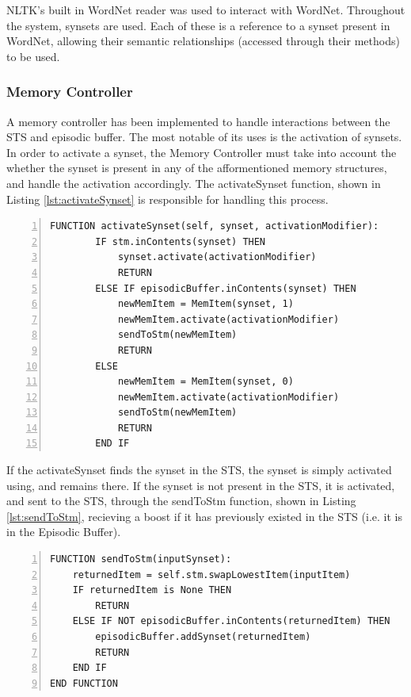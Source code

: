 \documentclass[]{article}
\begin{document}
NLTK's built in WordNet reader \cite{NLTK} was used to interact with WordNet. Throughout the system, synsets are used. Each of these is a reference to a synset present in WordNet, allowing their semantic relationships (accessed through their methods) to be used. 

\subsubsection{Memory Controller}
\label{sec:ImplementedMemoryController}

A memory controller has been implemented to handle interactions between the STS and episodic buffer. The most notable of its uses is the activation of synsets. In order to activate a synset, the Memory Controller must take into account the whether the synset is present in any of the afformentioned memory structures, and handle the activation accordingly. The activateSynset function, shown in Listing \ref{lst:activateSynset} is responsible for handling this process.

\begin{lstlisting}[numbers=left, numberstyle=\small, caption={the activateSynset function}, captionpos=b, label={lst:activateSynset}]
FUNCTION activateSynset(self, synset, activationModifier):
        IF stm.inContents(synset) THEN
            synset.activate(activationModifier)
            RETURN
        ELSE IF episodicBuffer.inContents(synset) THEN
            newMemItem = MemItem(synset, 1)
            newMemItem.activate(activationModifier)
            sendToStm(newMemItem)
            RETURN
        ELSE
            newMemItem = MemItem(synset, 0)
            newMemItem.activate(activationModifier)
            sendToStm(newMemItem)
            RETURN
        END IF
\end{lstlisting}

If the activateSynset finds the synset in the STS, the synset is simply activated using, and remains there. If the synset is not present in the STS, it is activated, and sent to the STS, through the sendToStm function, shown in Listing \ref{lst:sendToStm}, recieving a boost if it has previously existed in the STS (i.e. it is in the Episodic Buffer).

\begin{lstlisting}[numbers=left, numberstyle=\small, caption={the sendToStm function}, captionpos=b, label={lst:sendToStm}]
FUNCTION sendToStm(inputSynset):
	returnedItem = self.stm.swapLowestItem(inputItem)
    IF returnedItem is None THEN
        RETURN
    ELSE IF NOT episodicBuffer.inContents(returnedItem) THEN
        episodicBuffer.addSynset(returnedItem)
        RETURN
    END IF
END FUNCTION
\end{lstlisting}
\end{document}
